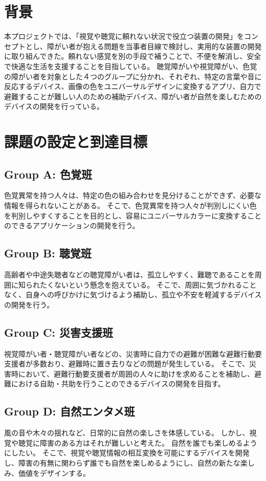\section{背景}
本プロジェクトでは、「視覚や聴覚に頼れない状況で役立つ装置の開発」をコンセプトとし、障がい者が抱える問題を当事者目線で検討し、実用的な装置の開発に取り組んできた。頼れない感覚を別の手段で補うことで、不便を解消し、安全で快適な生活を支援することを目指している。
聴覚障がいや視覚障がい、色覚の障がい者を対象とした４つのグループに分かれ、それぞれ、特定の言葉や音に反応するデバイス、画像の色をユニバーサルデザインに変換するアプリ、自力で避難することが難しい人のための補助デバイス、障がい者が自然を楽しむためのデバイスの開発を行っている。

\section{課題の設定と到達目標}
\subsection{Group A: 色覚班}
色覚異常を持つ人々は、特定の色の組み合わせを見分けることができず、必要な情報を得られないことがある。
そこで、色覚異常を持つ人々が判別しにくい色を判別しやすくすることを目的とし、容易にユニバーサルカラーに変換することのできるアプリケーションの開発を行う。

\subsection{Group B: 聴覚班}
高齢者や中途失聴者などの聴覚障がい者は、孤立しやすく、難聴であることを周囲に知られたくないという懸念を抱えている。
そこで、周囲に気づかれることなく、自身への呼びかけに気づけるよう補助し、孤立や不安を軽減するデバイスの開発を行う。

\subsection{Group C: 災害支援班}
視覚障がい者・聴覚障がい者などの、災害時に自力での避難が困難な避難行動要支援者が多数おり、避難時に置き去りなどの問題が発生している。
そこで、災害時において、避難行動要支援者が周囲の人々に助けを求めることを補助し、避難における自助・共助を行うことのできるデバイスの開発を目指す。

\subsection{Group D: 自然エンタメ班}
風の音や木々の揺れなど、日常的に自然の楽しさを体感している。
しかし、視覚や聴覚に障害のある方はそれが難しいと考えた。
自然を誰でも楽しめるようにしたい。
そこで、視覚や聴覚情報の相互変換を可能にするデバイスを開発し、障害の有無に関わらず誰でも自然を楽しめるようにし、自然の新たな楽しみ、価値をデザインする。

